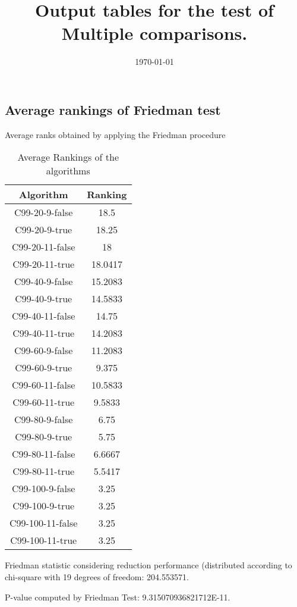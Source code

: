 \documentclass[a4paper,10pt]{article}
\title{Output tables for the test of Multiple comparisons.}
\author{}
\date{\today}
\begin{document}
\begin{landscape}
\pagestyle{empty}
\maketitle
\thispagestyle{empty}
\section{Average rankings of Friedman test}



Average ranks obtained by applying the Friedman procedure

\begin{table}[!htp]
\centering
\begin{tabular}{|c|c|}\hline
Algorithm&Ranking\\\hline
C99-20-9-false & 18.5\\
C99-20-9-true & 18.25\\
C99-20-11-false & 18\\
C99-20-11-true & 18.0417\\
C99-40-9-false & 15.2083\\
C99-40-9-true & 14.5833\\
C99-40-11-false & 14.75\\
C99-40-11-true & 14.2083\\
C99-60-9-false & 11.2083\\
C99-60-9-true & 9.375\\
C99-60-11-false & 10.5833\\
C99-60-11-true & 9.5833\\
C99-80-9-false & 6.75\\
C99-80-9-true & 5.75\\
C99-80-11-false & 6.6667\\
C99-80-11-true & 5.5417\\
C99-100-9-false & 3.25\\
C99-100-9-true & 3.25\\
C99-100-11-false & 3.25\\
C99-100-11-true & 3.25\\
\hline
\end{tabular}
\caption{Average Rankings of the algorithms}
\end{table}

Friedman statistic considering reduction performance (distributed according to chi-square with 19 degrees of freedom: 204.553571.

P-value computed by Friedman Test: 9.315070936821712E-11.\newline




\end{landscape}
\end{document}
